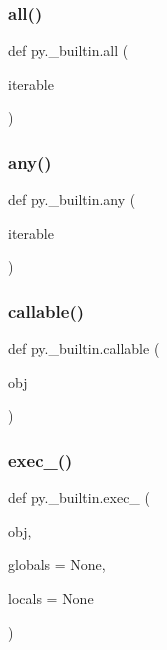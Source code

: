 \subsubsection{\texorpdfstring{all()}{all()}}
{\footnotesize\ttfamily def py.\+\_\+builtin.\+all (\begin{DoxyParamCaption}\item[{}]{iterable }\end{DoxyParamCaption})}

\mbox{\label{namespacepy_1_1__builtin_a3f594e247efb828922e4c80026813821}} 
\subsubsection{\texorpdfstring{any()}{any()}}
{\footnotesize\ttfamily def py.\+\_\+builtin.\+any (\begin{DoxyParamCaption}\item[{}]{iterable }\end{DoxyParamCaption})}

\mbox{\label{namespacepy_1_1__builtin_a869c49c20eff71f3b700aa5495f22844}} 
\subsubsection{\texorpdfstring{callable()}{callable()}}
{\footnotesize\ttfamily def py.\+\_\+builtin.\+callable (\begin{DoxyParamCaption}\item[{}]{obj }\end{DoxyParamCaption})}

\mbox{\label{namespacepy_1_1__builtin_a6e8904469a7a9531875865374f777dcd}} 
\subsubsection{\texorpdfstring{exec\+\_\+()}{exec\_()}}
{\footnotesize\ttfamily def py.\+\_\+builtin.\+exec\+\_\+ (\begin{DoxyParamCaption}\item[{}]{obj,  }\item[{}]{globals = {\ttfamily None},  }\item[{}]{locals = {\ttfamily None} }\end{DoxyParamCaption})}

